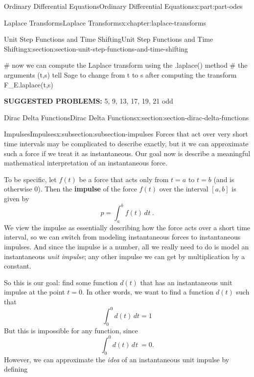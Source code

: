 \documentclass[oneside,10pt,]{book}
\newcommand{\terminology}[1]{\textbf{#1}}
\numberwithin{equation}{part}
\newcommand{\dd}[2][]{\, d^{#1} #2\ }
\newcommand{\Int}[2]{\int_{#1}^{#2}}
\begin{document}
\begin{partptx}{Ordinary Differential Equations}{}{Ordinary Differential Equations}{}{}{x:part:part-odes}
\begin{chapterptx}{Laplace Transforms}{}{Laplace Transforms}{}{}{x:chapter:laplace-transforms}
\begin{sectionptx}{Unit Step Functions and Time Shifting}{}{Unit Step Functions and Time Shifting}{}{}{x:section:section-unit-step-functions-and-time-shifting}
\begin{sageinput}
# now we can compute the Laplace transform using the .laplace() method
# the arguments (t,s) tell Sage to change from t to s after computing the transform
F_E.laplace(t,s)
\end{sageinput}
\terminology{SUGGESTED PROBLEMS:} 5, 9, 13, 17, 19, 21 odd\end{sectionptx}
%
%
\typeout{************************************************}
\typeout{************************************************}
%
\begin{sectionptx}{Dirac Delta Functions}{}{Dirac Delta Functions}{}{}{x:section:section-dirac-delta-functions}
%
%
\typeout{************************************************}
\typeout{************************************************}
%
\begin{subsectionptx}{Impulses}{}{Impulses}{}{}{x:subsection:subsection-impulses}
Forces that act over very short time intervals may be complicated to describe exactly, but it we can approximate such a force if we treat it as instantaneous. Our goal now is describe a meaningful mathematical interpretation of an instantaneous force.%
\par
To be specific, let \(f(t)\) be a force that acts only from \(t=a\) to \(t=b\) (and is otherwise \(0\)). Then the \terminology{impulse} of the force \(f(t)\) over the interval \([a,b]\) is given by%
\begin{equation*}
p = \Int{a}{b}f(t)\dd{t}.
\end{equation*}
We view the impulse as essentially describing how the force acts over a short time interval, so we can switch from modeling instantaneous forces to instantaneous impulses. And since the impulse is a number, all we really need to do is model an instantaneous \emph{unit impulse}; any other impulse we can get by multiplication by a constant.%
\par
So this is our goal: find some function \(d(t)\) that has an instantaneous unit impulse at the point \(t=0\). In other words, we want to find a function \(d(t)\) such that%
\begin{equation*}
\int_{0}^{0}d(t)\,dt = 1
\end{equation*}
But this is impossible for any function, since%
\begin{equation*}
\Int{0}{0}d(t)\dd{t} = 0.
\end{equation*}
However, we can approximate the \emph{idea} of an instantaneous unit impulse by defining%
\begin{equation*}

\end{equation*}
\end{subsectionptx}
\end{sectionptx}
\end{chapterptx}
\end{partptx}
\end{document}
